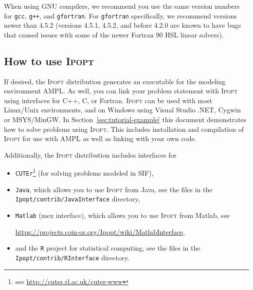 \documentclass[10pt]{article}
\newcommand{\Ipopt}{\textsc{Ipopt}\xspace}
\begin{document}
When using GNU compilers, we recommend you use the same version numbers for {\tt gcc}, {\tt g++}, and {\tt gfortran}. For {\tt gfortran} specifically, we recommend versions newer than 4.5.2 (versions 4.5.1, 4.5.2, and before 4.2.0 are known to have bugs that caused issues with some of the newer Fortran 90 HSL linear solvers).

\subsection{How to use \Ipopt}
If desired, the \Ipopt distribution generates an executable for the
modeling environment AMPL. As well, you can link your problem
statement with \Ipopt using interfaces for C++, C, or Fortran.
\Ipopt can be used with most Linux/Unix environments, and on Windows
using Visual Studio .NET, Cygwin or MSYS/MinGW.  In
Section~\ref{sec:tutorial-example} this document demonstrates how to
solve problems using \Ipopt. This includes installation and
compilation of \Ipopt for use with AMPL as well as linking with your
own code.

Additionally, the \Ipopt distribution includes interfaces for
\begin{itemize}
\item {\tt CUTEr}\footnote{see \url{http://cuter.rl.ac.uk/cuter-www}} (for
  solving problems modeled in SIF),

\item {\tt Java}, which allows you to use \Ipopt from Java, see the files in the
\texttt{Ipopt/contrib/JavaInterface} directory,
  
\item {\tt Matlab} (mex interface), which allows you to use \Ipopt from Matlab, see

\centerline{\url{https://projects.coin-or.org/Ipopt/wiki/MatlabInterface},}

\item and the {\tt R} project for statistical computing, see the files in the
\texttt{Ipopt/contrib/RInterface} directory.
\end{itemize}
\end{document}
